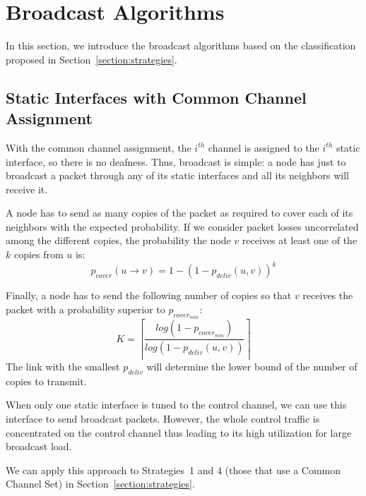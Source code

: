 \documentclass[twoside]{article}
\begin{document}
\section{Broadcast Algorithms}
\label{section:algorithms}


In this section, we introduce the broadcast algorithms based on the classification
proposed in Section~\ref{section:strategies}. 



\subsection{Static Interfaces with Common Channel Assignment}
\label{section:algo_ccs}


With the common channel assignment, the $i^{th}$ channel is assigned to the
$i^{th}$ static interface, so there is no deafness. 
Thus, broadcast is simple: a node has just to broadcast a packet through 
any of its static interfaces and all its neighbors will receive it. 


A node has to send as many copies of the packet as required to cover each of its neighbors with the expected probability.
If we consider packet losses uncorrelated among the different copies, the probability the node $v$ receives at least one of the $k$ copies from $u$ is:
\begin{equation}
	p_{cover}(u \rightarrow v) = 1 -  \left(1 - p_{deliv}(u,v)\right)^k
	\label{eq:pcover_kcopies}
\end{equation}



Finally, a node has to send the following number of copies so that $v$ receives
the packet with a probability superior to
$p_{cover_{min}}$:
\begin{equation}
	K = \left\lceil \frac{log (1 - p_{cover_{min}})}{log(1 - p_{deliv}(u, v) ) } \right\rceil
	\label{eq:per_common_channel}
\end{equation}
The link with the smallest $p_{deliv}$ will determine the lower bound of the
number of copies to transmit. 

When only one static interface is tuned to the control channel, we can use this interface to send broadcast packets. 
However, the whole control traffic is concentrated on the control channel thus leading to its high utilization for
large broadcast load.

We can apply this approach to Strategies~1 and 4 (those that use a Common Channel Set) in Section~\ref{section:strategies}.
\end{document}
